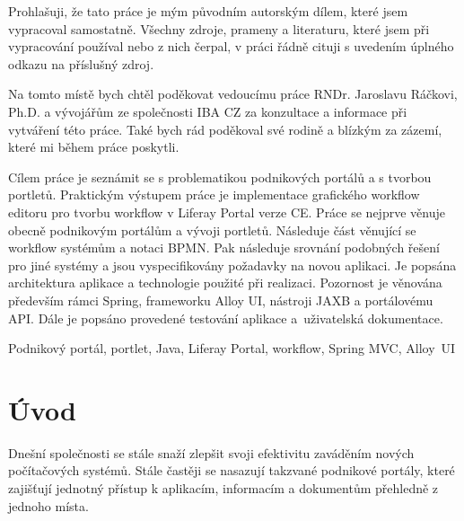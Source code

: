 \documentclass{fithesis}
\begin{document}
\FrontMatter
\ThesisTitlePage

\begin{ThesisDeclaration}
Prohlašuji, že tato práce je mým původním autorským dílem, které jsem
vypracoval samostatně. Všechny zdroje, prameny a literaturu, které jsem při vypracování používal nebo z nich čerpal, v práci řádně cituji s uvedením
úplného odkazu na příslušný zdroj.\AdvisorName
\end{ThesisDeclaration}

\begin{ThesisThanks}
Na tomto místě bych chtěl poděkovat vedoucímu práce RNDr. Jaroslavu Ráčkovi, Ph.D. a vývojářům ze společnosti IBA CZ za konzultace a informace při vytváření této práce. Také bych rád poděkoval své rodině a blízkým za zázemí, které mi během práce poskytli.
\end{ThesisThanks}

\begin{ThesisAbstract}
Cílem práce je seznámit se s problematikou podnikových portálů a s tvorbou portletů. Praktickým výstupem práce je implementace grafického workflow editoru pro tvorbu workflow v Liferay Portal verze CE. Práce se nejprve věnuje obecně podnikovým portálům a vývoji portletů. Následuje část věnující se workflow systémům a notaci BPMN. Pak následuje srovnání podobných řešení pro jiné systémy a jsou vyspecifikovány požadavky na novou aplikaci. Je popsána architektura aplikace a technologie použité při realizaci. Pozornost je věnována především rámci Spring, frameworku Alloy UI, nástroji JAXB a portálovému API. Dále je popsáno provedené testování aplikace a~uživatelská dokumentace.
\end{ThesisAbstract}

\begin{ThesisKeyWords}
Podnikový portál, portlet, Java, Liferay Portal, workflow, Spring MVC, Alloy~UI
\end{ThesisKeyWords}


\MainMatter
\setcounter{secnumdepth}{4}
\tableofcontents

\chapter{Úvod}
Dnešní společnosti se stále snaží zlepšit svoji efektivitu zaváděním nových počítačových systémů. Stále častěji se nasazují takzvané podnikové portály, které zajišťují jednotný přístup k aplikacím, informacím a dokumentům přehledně z jednoho místa.
\end{document}
